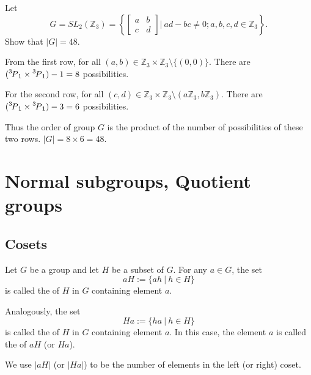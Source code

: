 \begin{example}
    Let 
    \[
        G = SL_2(\mathbb{Z}_3) = \left\{ \begin{bmatrix}
        a & b\\ c & d
        \end{bmatrix} \bigg \vert \> ad-bc \neq 0; a, b, c, d \in \mathbb{Z}_3 \right\}.
    \]
    Show that $|G| = 48$.
\end{example}
\begin{solution}
    From the first row, for all $(a,b) \in \mathbb{Z}_3 \times \mathbb{Z}_3 \setminus \{ (0,0)\}$. There are 
    $(\perm[3]{1} \times \perm[3]{1}) - 1 = 8$ possibilities.

    For the second row, for all $(c,d) \in \mathbb{Z}_3 \times \mathbb{Z}_3 \setminus (a\mathbb{Z}_3, b\mathbb{Z}_3)$.
    There are $(\perm[3]{1} \times \perm[3]{1}) - 3 = 6$ possibilities.

    Thus the order of group $G$ is the product of the number of possibilities of these two rows. $|G| = 8 \times 6 = 48$.
\end{solution}

\section{Normal subgroups, Quotient groups}

\subsection{Cosets}

\begin{definition}[Cosets]
    Let $G$ be a group and let $H$ be a subset of $G$. For any $a \in G$, the set 
    \[
        aH := \{ ah \> | \> h\in H\}
    \]
    is called the  of $H$ in $G$ containing element $a$. 

    Analogously, the set 
    \[
        Ha := \{ ha \> | \> h\in H\}
    \]
    is called the  of $H$ in $G$ containing element $a$.
    In this case, the element $a$ is called the  of 
    $aH$ (or $Ha$). 

    We use $|aH|$ (or $|Ha|$) to be the number of elements in the left (or right) coset.
\end{definition}

